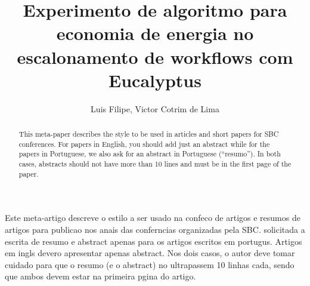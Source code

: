 \documentclass[12pt]{article}
\title{Experimento de algoritmo para economia de energia no\\
 escalonamento de workflows com Eucalyptus }
\author{Luis Filipe\inst{1}, Victor Cotrim de Lima\inst{1}}
\begin{document}
\maketitle

\begin{abstract}
  This meta-paper describes the style to be used in articles and short papers
  for SBC conferences. For papers in English, you should add just an abstract
  while for the papers in Portuguese, we also ask for an abstract in
  Portuguese (``resumo''). In both cases, abstracts should not have more than
  10 lines and must be in the first page of the paper.
\end{abstract}

\begin{resumo}
  Este meta-artigo descreve o estilo a ser usado na confeco de artigos e
  resumos de artigos para publicao nos anais das conferncias organizadas
  pela SBC.  solicitada a escrita de resumo e abstract apenas para os artigos
  escritos em portugus. Artigos em ingls devero apresentar apenas abstract.
  Nos dois casos, o autor deve tomar cuidado para que o resumo (e o abstract)
  no ultrapassem 10 linhas cada, sendo que ambos devem estar na primeira
  pgina do artigo.
\end{resumo}







\end{document}
